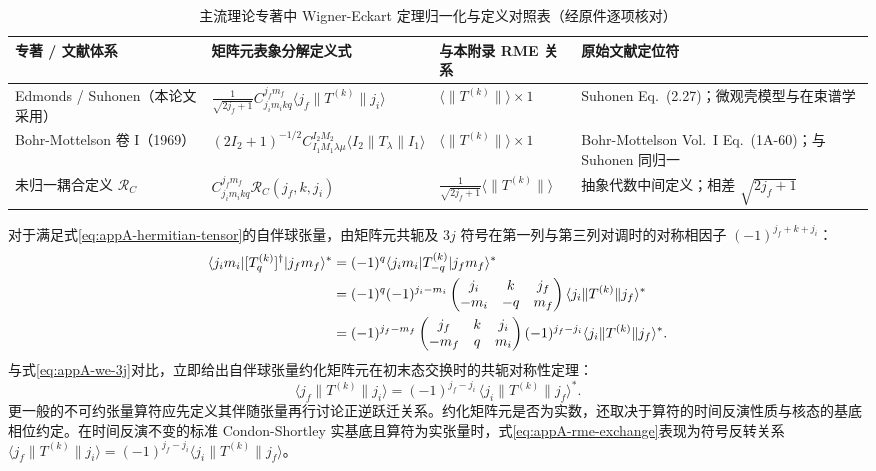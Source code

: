 \begin{table}[htbp]
\centering
\small
\caption{主流理论专著中 Wigner-Eckart 定理归一化与定义对照表（经原件逐项核对）}\label{tab:appA-convention-comparison}
\begin{tabularx}{\textwidth}{p{3.8cm} p{5.0cm} p{2.8cm} >{\raggedright\arraybackslash}X}
\toprule
专著 / 文献体系 & 矩阵元表象分解定义式 & 与本附录 RME 关系 & 原始文献定位符 \\
\midrule
Edmonds / Suhonen（本论文采用） & $\frac{1}{\sqrt{2j_f+1}} C_{j_i m_i k q}^{j_f m_f} \langle j_f \| T^{(k)} \| j_i \rangle$ & $\langle \| T^{(k)} \| \rangle \times 1$ & Suhonen Eq.~(2.27)；微观壳模型与在束谱学 \\
\addlinespace
Bohr-Mottelson 卷 I（1969） & $(2I_2 + 1)^{-1/2} C_{I_1 M_1 \lambda \mu}^{I_2 M_2} \langle I_2 \| T_\lambda \| I_1 \rangle$ & $\langle \| T^{(k)} \| \rangle \times 1$ & Bohr-Mottelson Vol.~I Eq.~(1A-60)；与 Suhonen 同归一 \\
\addlinespace
未归一耦合定义 $\mathcal{R}_C$ & $C_{j_i m_i k q}^{j_f m_f} \mathcal{R}_C(j_f, k, j_i)$ & $\frac{1}{\sqrt{2j_f+1}} \langle \| T^{(k)} \| \rangle$ & 抽象代数中间定义；相差 $\sqrt{2j_f+1}$ \\
\bottomrule
\end{tabularx}
\end{table}

对于满足式\eqref{eq:appA-hermitian-tensor}的自伴球张量，由矩阵元共轭及 $3j$ 符号在第一列与第三列对调时的对称相因子 $(-1)^{j_f + k + j_i}$：
\begin{align}\label{eq:appA-rme-adjoint-deriv}
\langle j_i m_i | [T_q^{(k)}]^\dagger | j_f m_f \rangle^* &= (-1)^q \langle j_i m_i | T_{-q}^{(k)} | j_f m_f \rangle^* \notag \\
&= (-1)^q (-1)^{j_i - m_i} \begin{pmatrix} j_i & k & j_f \\ -m_i & -q & m_f \end{pmatrix} \langle j_i \| T^{(k)} \| j_f \rangle^* \notag \\
&= (-1)^{j_f - m_f} \begin{pmatrix} j_f & k & j_i \\ -m_f & q & m_i \end{pmatrix} (-1)^{j_f - j_i} \langle j_i \| T^{(k)} \| j_f \rangle^* .
\end{align}
与式\eqref{eq:appA-we-3j}对比，立即给出自伴球张量约化矩阵元在初末态交换时的共轭对称性定理：
\begin{equation}\label{eq:appA-rme-exchange}
\langle j_f \| T^{(k)} \| j_i \rangle = (-1)^{j_f - j_i} \, \langle j_i \| T^{(k)} \| j_f \rangle^* .
\end{equation}
更一般的不可约张量算符应先定义其伴随张量再行讨论正逆跃迁关系。约化矩阵元是否为实数，还取决于算符的时间反演性质与核态的基底相位约定。在时间反演不变的标准 Condon-Shortley 实基底且算符为实张量时，式\eqref{eq:appA-rme-exchange}表现为符号反转关系 $\langle j_f \| T^{(k)} \| j_i \rangle = (-1)^{j_f - j_i} \langle j_i \| T^{(k)} \| j_f \rangle$。

